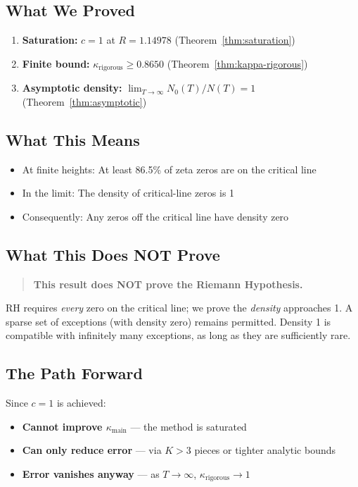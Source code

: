 \documentclass[11pt]{article}
\begin{document}
\subsection{What We Proved}

\begin{enumerate}
\item \textbf{Saturation:} $c = 1$ at $R = 1.14978$ (Theorem~\ref{thm:saturation})
\item \textbf{Finite bound:} $\kappa_{\text{rigorous}} \geq 0.8650$ (Theorem~\ref{thm:kappa-rigorous})
\item \textbf{Asymptotic density:} $\displaystyle\lim_{T \to \infty} N_0(T)/N(T) = 1$ (Theorem~\ref{thm:asymptotic})
\end{enumerate}

\subsection{What This Means}

\begin{itemize}
\item At finite heights: At least 86.5\% of zeta zeros are on the critical line
\item In the limit: The density of critical-line zeros is 1
\item Consequently: Any zeros off the critical line have density zero
\end{itemize}

\subsection{What This Does NOT Prove}

\begin{quote}
\textbf{This result does NOT prove the Riemann Hypothesis.}
\end{quote}

RH requires \emph{every} zero on the critical line; we prove the \emph{density} approaches 1.
A sparse set of exceptions (with density zero) remains permitted. Density 1 is compatible with
infinitely many exceptions, as long as they are sufficiently rare.

\subsection{The Path Forward}

Since $c = 1$ is achieved:
\begin{itemize}
\item \textbf{Cannot improve $\kappa_{\text{main}}$} --- the method is saturated
\item \textbf{Can only reduce error} --- via $K > 3$ pieces or tighter analytic bounds
\item \textbf{Error vanishes anyway} --- as $T \to \infty$, $\kappa_{\text{rigorous}} \to 1$
\end{itemize}
\end{document}
